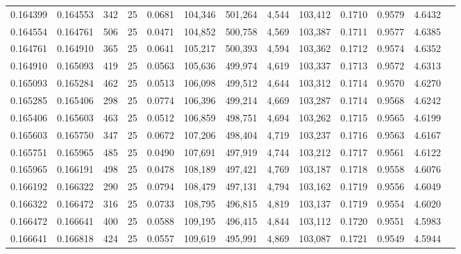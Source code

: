 \begin{tabular}{rrrrrrrrrrrrr}
0.164399 & 0.164553 &   342 &  25 &                                     0.0681 & 104,346 & 501,264 &   4,544 & 103,412 & 0.1710 & 0.9579 & 4.6432 \\
0.164554 & 0.164761 &   506 &  25 &                                     0.0471 & 104,852 & 500,758 &   4,569 & 103,387 & 0.1711 & 0.9577 & 4.6385 \\
0.164761 & 0.164910 &   365 &  25 &                                     0.0641 & 105,217 & 500,393 &   4,594 & 103,362 & 0.1712 & 0.9574 & 4.6352 \\
0.164910 & 0.165093 &   419 &  25 &                                     0.0563 & 105,636 & 499,974 &   4,619 & 103,337 & 0.1713 & 0.9572 & 4.6313 \\
0.165093 & 0.165284 &   462 &  25 &                                     0.0513 & 106,098 & 499,512 &   4,644 & 103,312 & 0.1714 & 0.9570 & 4.6270 \\
0.165285 & 0.165406 &   298 &  25 &                                     0.0774 & 106,396 & 499,214 &   4,669 & 103,287 & 0.1714 & 0.9568 & 4.6242 \\
0.165406 & 0.165603 &   463 &  25 &                                     0.0512 & 106,859 & 498,751 &   4,694 & 103,262 & 0.1715 & 0.9565 & 4.6199 \\
0.165603 & 0.165750 &   347 &  25 &                                     0.0672 & 107,206 & 498,404 &   4,719 & 103,237 & 0.1716 & 0.9563 & 4.6167 \\
0.165751 & 0.165965 &   485 &  25 &                                     0.0490 & 107,691 & 497,919 &   4,744 & 103,212 & 0.1717 & 0.9561 & 4.6122 \\
0.165965 & 0.166191 &   498 &  25 &                                     0.0478 & 108,189 & 497,421 &   4,769 & 103,187 & 0.1718 & 0.9558 & 4.6076 \\
0.166192 & 0.166322 &   290 &  25 &                                     0.0794 & 108,479 & 497,131 &   4,794 & 103,162 & 0.1719 & 0.9556 & 4.6049 \\
0.166322 & 0.166472 &   316 &  25 &                                     0.0733 & 108,795 & 496,815 &   4,819 & 103,137 & 0.1719 & 0.9554 & 4.6020 \\
0.166472 & 0.166641 &   400 &  25 &                                     0.0588 & 109,195 & 496,415 &   4,844 & 103,112 & 0.1720 & 0.9551 & 4.5983 \\
0.166641 & 0.166818 &   424 &  25 &                                     0.0557 & 109,619 & 495,991 &   4,869 & 103,087 & 0.1721 & 0.9549 & 4.5944 \\

\end{tabular}
